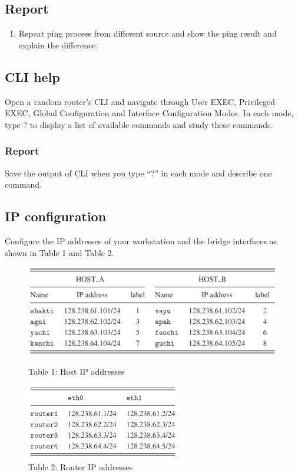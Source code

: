 \documentclass[10pt,a4paper]{article}
\numberwithin{equation}{section}
\numberwithin{figure}{section}
\numberwithin{table}{section}
\begin{document}
    \subsection*{Report}
    \begin{enumerate}
        \item Repeat ping process from different source and show the ping result and explain the difference.

    \end{enumerate}
    
\subsection{CLI help}
    Open a random router’s CLI and navigate through User EXEC, Privileged EXEC, Global Configuration and Interface Configuration Modes. In each mode, type ? to display a list of available commands and study these commands.

\subsubsection*{Report}
 Save the output of CLI when you type “?” in each mode and describe one command.
    

\subsection{IP configuration}
    Configure the IP addresses of your workstation and the bridge interfaces as shown in Table 1 and Table 2.\\

    \begin{figure}[H]
        \centering
        \includegraphics[width=\textwidth]{img/table1.png}
        \caption{Table 1: Host IP addresses}
        \label{tbl:table1}
        \includegraphics[width=0.6\textwidth]{img/table2.png}
        \caption{Table 2: Router IP addresses}
        \label{tbl:table2}
    \end{figure}
\end{document}
